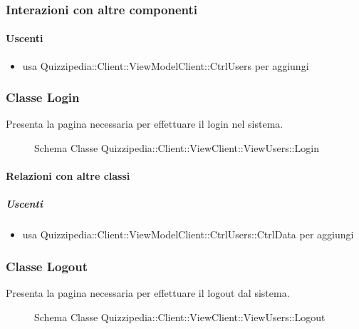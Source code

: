 \subsubsection{Interazioni con altre componenti}
\paragraph{Uscenti}
\begin{itemize}
\item usa Quizzipedia::Client::ViewModelClient::CtrlUsers per aggiungi
\end{itemize}
\subsubsection{Classe Login}
Presenta la pagina necessaria per effettuare il login nel sistema.
\begin{figure}[H]
\centering
\noindent{}
\caption[Schema Classe Login]{Schema Classe Quizzipedia::Client::ViewClient::ViewUsers::Login}
\end{figure}
\paragraph{Relazioni con altre classi}
\subparagraph{Uscenti}
\begin{itemize}
\item usa Quizzipedia::Client::ViewModelClient::CtrlUsers::CtrlData per aggiungi
\end{itemize}
\subsubsection{Classe Logout}
Presenta la pagina necessaria per effettuare il logout dal sistema.
\begin{figure}[H]
\centering
\noindent{}
\caption[Schema Classe Logout]{Schema Classe Quizzipedia::Client::ViewClient::ViewUsers::Logout}
\end{figure}
